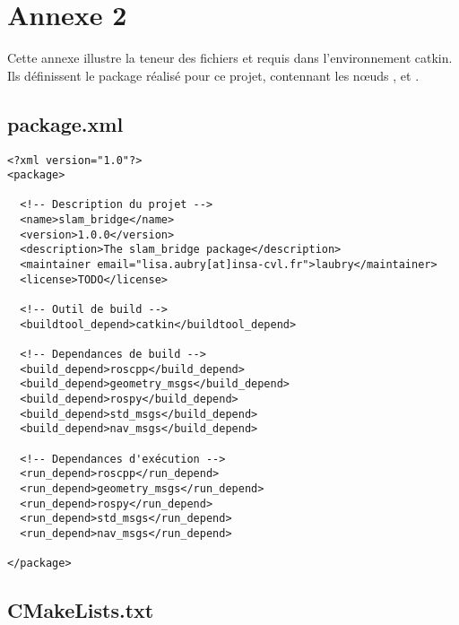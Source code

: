 \chapter*{Annexe 2}
\label{annexe:catkindocs}

\makeatletter
\renewcommand{\thesection}{\@arabic\c@section}
\makeatother

\setcounter{section}{0}

Cette annexe illustre la teneur des fichiers  et  requis dans l'environnement catkin.
Ils définissent le package  réalisé pour ce projet, contennant les n\oe{}uds ,  et . 

\section{package.xml}

\begin{lstlisting}[style=customcatkin]
<?xml version="1.0"?>
<package>

  <!-- Description du projet --> 
  <name>slam_bridge</name>
  <version>1.0.0</version>
  <description>The slam_bridge package</description>
  <maintainer email="lisa.aubry[at]insa-cvl.fr">laubry</maintainer>
  <license>TODO</license>
  
  <!-- Outil de build --> 
  <buildtool_depend>catkin</buildtool_depend>
  
  <!-- Dependances de build --> 
  <build_depend>roscpp</build_depend>
  <build_depend>geometry_msgs</build_depend>
  <build_depend>rospy</build_depend>
  <build_depend>std_msgs</build_depend>
  <build_depend>nav_msgs</build_depend>

  <!-- Dependances d'exécution -->
  <run_depend>roscpp</run_depend>
  <run_depend>geometry_msgs</run_depend>
  <run_depend>rospy</run_depend>
  <run_depend>std_msgs</run_depend>
  <run_depend>nav_msgs</run_depend>
  
</package>
\end{lstlisting}

\newpage 
\section{CMakeLists.txt}

